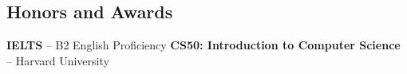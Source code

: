 \documentclass[../main.tex]{subfiles}
\begin{document}
\begin{category}
\section{Honors and Awards}
    \citembullet \textbf{IELTS} -- B2 English Proficiency
    \citembullet \textbf{CS50: Introduction to Computer Science} -- Harvard University
\end{category}
\end{document}

